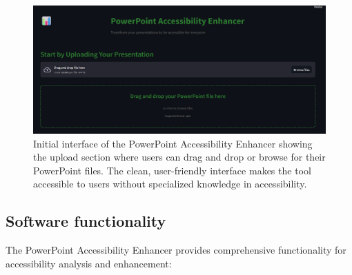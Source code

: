 \documentclass[preprint,review,12pt]{elsarticle} %
\begin{document}
\begin{figure}[h]
    \centering
    \includegraphics[width=\textwidth]{Figures/fig1_ppp.png}
    \caption{Initial interface of the PowerPoint Accessibility Enhancer showing the upload section where users can drag and drop or browse for their PowerPoint files. The clean, user-friendly interface makes the tool accessible to users without specialized knowledge in accessibility.}
    \label{fig:initial-interface}
\end{figure}

\subsection{Software functionality}
The PowerPoint Accessibility Enhancer provides comprehensive functionality for accessibility analysis and enhancement:
\end{document}
